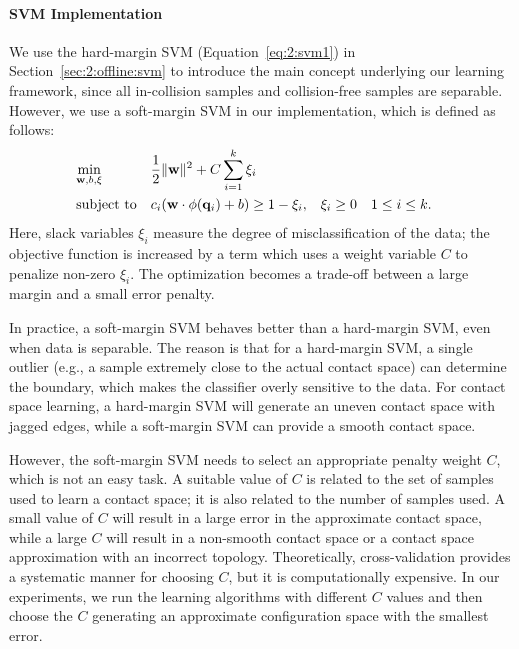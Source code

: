 \paragraph{SVM Implementation}
We use the hard-margin SVM (Equation~\ref{eq:2:svm1}) in Section~\ref{sec:2:offline:svm} to introduce the main concept underlying our learning framework, since all in-collision samples and collision-free samples are separable. However, we use a soft-margin SVM in our implementation, which is defined as follows:
\begin{align}
\label{eq:2:svmsoft}
& \underset{\mathbf w, b, \xi}{\text{min}} & & \frac{1}{2}\|\mathbf w\|^2 + C \sum_{i=1}^k \xi_i & &  \\
& \text{subject to} & & c_i (\mathbf w \cdot \phi(\mathbf q_i) + b)
\geq 1 - \xi_i, & & \xi_i \geq 0 & & 1 \leq i \leq k. \notag
\end{align}
Here, slack variables $\xi_i$ measure the degree of misclassification of the data; the objective function is increased by a term which uses a weight variable $C$ to penalize non-zero $\xi_i$. The optimization becomes a trade-off between a large margin and a small error penalty. 

In practice, a soft-margin SVM behaves better than a hard-margin SVM, even when data is separable. The reason is that for a hard-margin SVM, a single outlier (e.g., a sample extremely close to the actual contact space) can determine the boundary, which makes the classifier overly sensitive to the data. For contact space learning, a hard-margin SVM will generate an uneven contact space with jagged edges, while a soft-margin SVM can provide a smooth contact space. 

However, the soft-margin SVM needs to select an appropriate penalty weight $C$, which is not an easy task. A suitable value of $C$ is related to the set of samples used to learn a contact space; it is also related to the number of samples used. A small value of $C$ will result in a large error in the approximate contact space, while a large $C$ will result in a non-smooth contact space or a contact space approximation with an incorrect topology. Theoretically, cross-validation provides a systematic manner for choosing $C$, but it is computationally expensive. In our experiments, we run the learning algorithms with different $C$ values and then choose the $C$ generating an approximate configuration space with the smallest error. 


